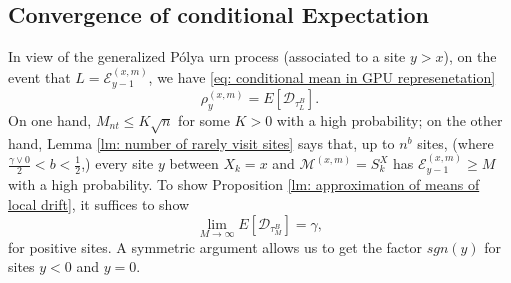 \documentclass[twoside,12pt,a4paper]{article}
\numberwithin{equation}{section}
\begin{document}
{		\subsection{Convergence of conditional Expectation}
		In view of the generalized P\'{o}lya urn process (associated to a site $y> x$), on the event that $ L = \mathcal{E}^{(x,m)}_{y-1}$, we have \eqref{eq: conditional mean in GPU represenetation} 
		$$\rho^{(x,m)}_y = E[\mathcal{D}_{\tau_L^B}].$$ 
		On one hand, $M_{nt} \leq K\sqrt{n} $ for some $K>0$ with a high probability; on the other hand, Lemma \ref{lm: number of rarely visit sites} says that, up to $n^b$ sites, (where $\frac{\gamma \vee 0}{2}<b<\frac{1}{2}$,) every site $y$ between $X_k=x$ and $\mathcal{M}^{(x,m)} =S_{k}^X$ has $ \mathcal{E}^{(x,m)}_{y-1} \geq M  $ with a high probability. To show Proposition \ref{lm: approximation of means of local drift}, it suffices to show 
		\begin{equation}\label{eq: convergence of conditional expectation}
			\lim_{M\to\infty} E[\mathcal{D}_{\tau_M^B}] = \gamma , 
		\end{equation} for positive sites. A symmetric argument allows us to get the factor $sgn(y)$ for sites $y<0$ and $y=0$.
		
}
\end{document}
